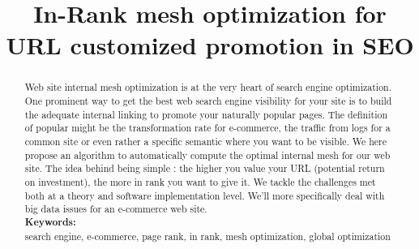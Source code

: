 \documentclass{iSWAGArticle}
\title{In-Rank mesh optimization for URL customized promotion in SEO}
\author{\iSWAGAuthor{Stefan Duprey\\
Cdiscount\\
stefan.duprey@cdiscount.com} \and \iSWAGAuthor{Second Author\\
Second University\\
second.author@university2.com}}
\begin{document}
\maketitle

\begin{abstract}
 Web site internal mesh optimization is at the very heart of search engine optimization. 
 One prominent way to get the best web search engine visibility for your site 
 is to build the adequate internal linking to promote your naturally popular pages. 
 The definition of popular might be the transformation rate for e-commerce, 
 the traffic from logs for a common site or even rather a specific semantic where you want to be visible. 
 We here propose an algorithm to automatically compute the optimal internal mesh for our web site. The idea
 behind being simple : the higher you value your URL (potential return on investment), the more in rank you want to give it.
 We tackle the challenges met both at a theory and software implementation level. 
 We'll more specifically deal with big data issues for an e-commerce web site.
 \\\newline
 \indent \textbf{Keywords: }
 \\\newline
search engine, e-commerce, page rank, in rank, mesh optimization, global optimization
\end{abstract}
\end{document}
